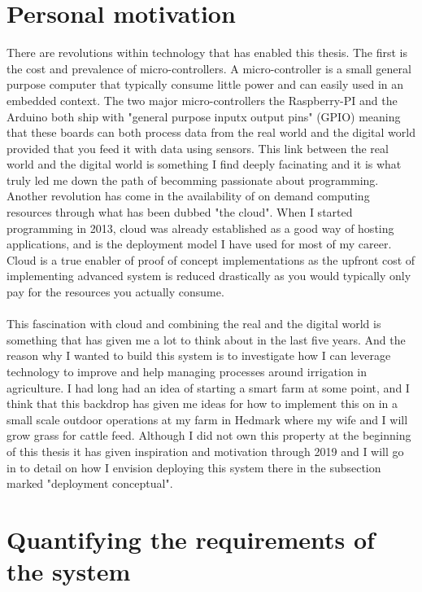 \documentclass[]{uiophd}
\begin{document}
\section{Personal motivation}
There are revolutions within technology that has enabled this thesis. The first is the cost and prevalence of micro-controllers. A micro-controller is a small general purpose computer that typically consume little power and can easily used in an embedded context. The two major micro-controllers the Raspberry-PI and the Arduino both ship with "general purpose inputx output pins" (GPIO) meaning that these boards can both process data from the real world and the digital world provided that you feed it with data using sensors. This link between the real world and the digital world is something I find deeply facinating and it is what truly led me down the path of becomming passionate about programming. Another revolution has come in the availability of on demand computing resources through what has been dubbed "the cloud". When I started programming in 2013, cloud was already established as a good way of hosting applications, and is the deployment model I have used for most of my career. Cloud is a true enabler of proof of concept implementations as the upfront cost of implementing advanced system is reduced drastically as you would typically only pay for the resources you actually consume.
\\\\
This fascination with cloud and combining the real and the digital world is something that has given me a lot to think about in the last five years. And the reason why I wanted to build this system is to investigate how I can leverage technology to improve and help managing processes around irrigation in agriculture. I had long had an idea of starting a smart farm at some point, and I think that this backdrop has given me ideas for how to implement this on in a small scale outdoor operations at my farm in Hedmark where my wife and I will grow grass for cattle feed. Although I did not own this property at the beginning of this thesis it has given inspiration and motivation through 2019 and I will go in to detail on how I envision deploying this system there in the subsection marked "deployment conceptual".

\section{Quantifying the requirements of the system}
\end{document}
